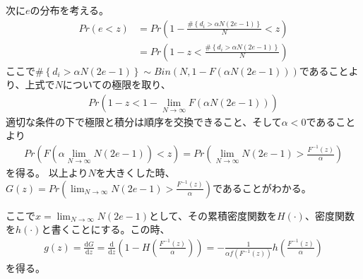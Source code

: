 \documentclass{jsarticle}
\begin{document}
次に$e$の分布を考える。
\begin{align*}
	Pr\left( e < z \right) &= Pr\left( 1 - \frac{\# \left\{ d_i > \alpha N (2 e - 1) \right\}}{N} < z \right)\\[8pt]
	&= Pr\left(1 - z < \frac{\# \left\{ d_i > \alpha N (2 e - 1) \right\}}{N} \right)
\end{align*}
ここで$\# \left\{ d_i > \alpha N (2 e - 1) \right\} \sim Bin(N, 1 - F(\alpha N (2 e - 1)))$であることより、上式で$N$についての極限を取り、
\begin{align*}
	Pr\left(1 - z < 1 - \lim_{N\to \infty}F(\alpha N (2e - 1))  \right)
\end{align*}
適切な条件の下で極限と積分は順序を交換できること、そして$\alpha < 0$であることより
\begin{align*}
	Pr\left(F(\alpha \lim_{N\to \infty} N (2e - 1)) < z \right) = Pr\left( \lim_{N\to \infty} N (2e-1) > \frac{F^{-1}(z)}{\alpha} \right)
\end{align*}
を得る。
以上より$N$を大きくした時、$G(z) = Pr\left( \lim_{N\to \infty} N (2e-1) > \frac{F^{-1}(z)}{\alpha} \right)$であることがわかる。

ここで$x = \lim_{N\to \infty} N (2e-1)$として、その累積密度関数を$H(\cdot)$、密度関数を$h(\cdot)$と書くことにする。この時、
\begin{align*}
	g(z) = \frac{\mathrm{d}G}{\mathrm{d}z} = \frac{\mathrm{d}}{\mathrm{d}z} \left( 1 - H\left(\frac{F^{-1}(z)}{\alpha}\right) \right) = -\frac{1}{\alpha f(F^{-1}(z))} h\left(\frac{F^{-1}(z)}{\alpha}\right)
\end{align*}
を得る。
\end{document}
